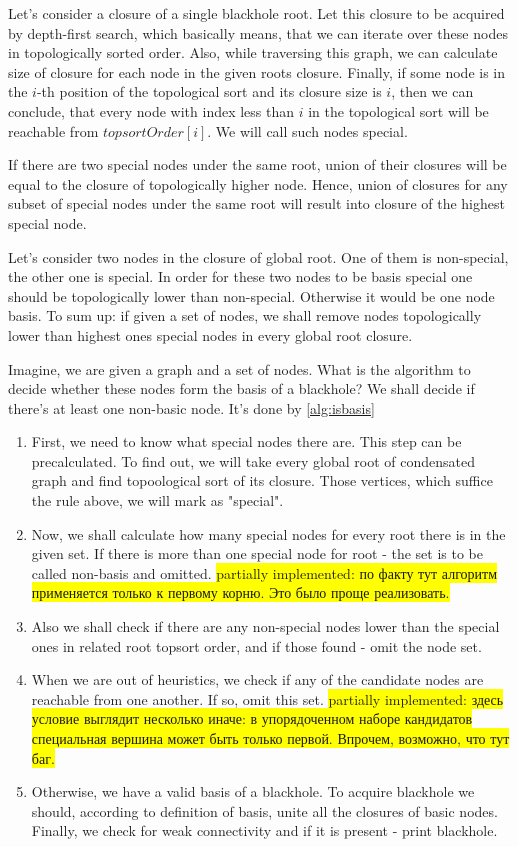 \documentclass{svproc}
\newcommand{\FIXME}[1]{ %
	\colorbox{yellow}{#1}
}
\newcommand{\FIXME}[1]{ %
}
\begin{document}
Let's consider a closure of a single blackhole root. Let this closure to be acquired by depth-first search, which basically means, that
we can iterate over these nodes in topologically sorted order. Also, while traversing this graph, we can calculate size of closure for each node
in the given roots closure. Finally, if some node is in the $i$-th position of the topological sort and its closure size is $i$, then we can 
conclude, that every node with index less than $i$ in the topological sort will be reachable from $topsortOrder[i]$. We will call such nodes special.

If there are two special nodes under the same root, union of their closures will be equal to the closure of topologically higher node.
Hence, union of closures for any subset of special nodes under the same root will result into closure of the highest special node.

Let's consider two nodes in the closure of global root. One of them is non-special, the other one is special. In order for these two nodes to be basis
special one should be topologically lower than non-special. Otherwise it would be one node basis.
To sum up: if given a set of nodes, we shall remove nodes topologically lower than highest ones special nodes in every global root closure.

Imagine, we are given a graph and a set of nodes. What is the algorithm to decide whether these nodes form the basis of a blackhole? We shall decide if there's at least
one non-basic node. It's done by \ref{alg:isbasis}
\begin{enumerate}
    \item First, we need to know what special nodes there are. This step can be precalculated. 
    To find out, we will take every global root of condensated graph and find topoological sort of its closure.
    Those vertices, which suffice the rule above, we will mark as "special". 
    \item Now, we shall calculate how many special nodes for every root there is in the given set. If there is more than one special node for root - the set is to be called non-basis and
    omitted.
    \FIXME{partially implemented: по факту тут алгоритм применяется только к первому корню. Это было проще реализовать. }
    \item Also we shall check if there are any non-special nodes lower than the special ones in related root topsort order, and if those found - omit the node set.
    \item When we are out of heuristics, we check if any of the candidate nodes are reachable from one another. If so, omit this set. 
    \FIXME{partially implemented: здесь условие выглядит несколько иначе: в упорядоченном наборе кандидатов специальная вершина может быть только первой. Впрочем, возможно, что тут баг. }
    \item Otherwise, we have a valid basis of a blackhole.
    To acquire blackhole we should, according to definition of basis, unite all the closures of basic nodes.
    Finally, we check for weak connectivity and if it is present - print blackhole.
\end{enumerate}
\end{document}
